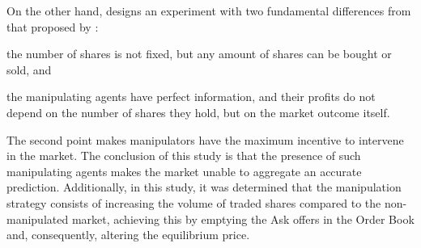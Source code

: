On the other hand, \citeauthor{deck2013affecting} designs an experiment with two fundamental differences from that proposed by : \begin{enumerate*}[label=(\roman*)]
    \item the number of shares is not fixed, but any amount of shares can be bought or sold, and
    \item the manipulating agents have perfect information, and their profits do not depend on the number of shares they hold, but on the market outcome itself.
\end{enumerate*} 
The second point makes manipulators have the maximum incentive to intervene in the market. The conclusion of this study is that the presence of such manipulating agents makes the market unable to aggregate an accurate prediction. Additionally, in this study, it was determined that the manipulation strategy consists of increasing the volume of traded shares compared to the non-manipulated market, achieving this by emptying the Ask offers in the Order Book and, consequently, altering the equilibrium price. 